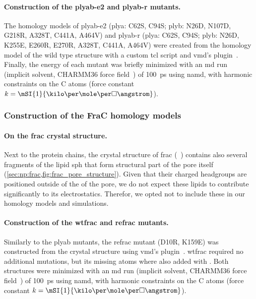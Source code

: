 \paragraph{Construction of the \gls{plyab-e2} and \gls{plyab-r} mutants.}
%
The homology models of \gls{plyab-e2} (\gls{plya}: C62S, C94S; \gls{plyb}: N26D, N107D, G218R, A328T, C441A,
A464V) and \gls{plyab-r} (\gls{plya}: C62S, C94S; \gls{plyb}: N26D, K255E, E260R, E270R, A328T, C441A, A464V)
were created from the homology model of the wild type structure with a custom \gls{tcl} script and \gls{vmd}'s
 plugin~\cite{Humphrey-1996}. Finally, the energy of each mutant was briefly minimized with an
\gls{md} run (implicit solvent, CHARMM36 force field~\cite{Best-2012}) of \SI{100}{\ps} using \gls{namd}, with
harmonic constraints on the C\ta{} atoms (force constant $k =
\mSI{1}{\kilo\cal\per\mole\per\square\angstrom}$).


\subsubsection{Construction of the FraC homology models}
%

\paragraph{On the \gls{frac} crystal structure.}
%
Next to the protein chains, the crystal structure of \gls{frac} (~\cite{Tanaka-2015}) contains
also several fragments of the lipid \gls{sph} that form structural part of the pore itself
(\cref{sec:np:frac,fig:frac_pore_structure}). Given that their charged headgroups are positioned outside of
the \lumen{} of the pore, we do not expect these lipids to contribute significantly to its electrostatics.
Therefor, we opted not to include these in our homology models and simulations.

\paragraph{Construction of the \gls{wtfrac} and \gls{refrac} mutants.}
%
Similarly to the \gls{plyab} mutants, the \gls{refrac} mutant (D10R, K159E) was constructed from the crystal
structure using \gls{vmd}'s  plugin~\cite{Humphrey-1996}. \Gls{wtfrac} required no additional
mutations, but its missing atoms where also added with . Both structures were minimized with an
\gls{md} run (implicit solvent, CHARMM36 force field~\cite{Best-2012}) of \SI{100}{\ps} using \gls{namd}, with
harmonic constraints on the C\ta{} atoms (force constant $k =
\mSI{1}{\kilo\cal\per\mole\per\square\angstrom}$).


